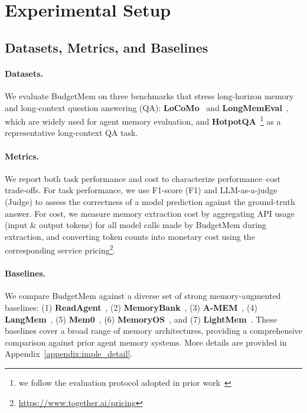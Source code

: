 \section{Experimental Setup}
\label{sec:exp}






\subsection{Datasets, Metrics, and Baselines}
\label{sec:datasets_metrics_baselines}

\paragraph{Datasets.}
We evaluate BudgetMem on three benchmarks that stress long-horizon memory and long-context question answering (QA): \textbf{LoCoMo}~\citep{maharana2024evaluating-locomo} and \textbf{LongMemEval}~\citep{wu2024longmemeval}, which are widely used for agent memory evaluation, and \textbf{HotpotQA}~\citep{yang2018hotpotqa}\footnote{we follow the evaluation protocol adopted in prior work~\citep{yu2025memagent}} as a representative long-context QA task. 


\paragraph{Metrics.}
We report both task performance and cost to characterize performance--cost trade-offs.
For task performance, we use F1-score (F1) and LLM-as-a-judge (Judge) to assess the correctness of a model prediction against the ground-truth answer.
For cost, we measure memory extraction cost by aggregating API usage (input \& output tokens) for all model calls made by BudgetMem during extraction, and converting token counts into monetary cost using the corresponding service pricing\footnote{\url{https://www.together.ai/pricing}}.



\paragraph{Baselines.}
We compare BudgetMem against a diverse set of strong memory-augmented baselines: 
(1) \textbf{ReadAgent}~\citep{lee2024human}, (2) \textbf{MemoryBank}~\citep{zhong2024memorybank}, (3) \textbf{A-MEM}~\citep{xu2025mem}, (4) \textbf{LangMem}~\citep{LangMem}, (5) \textbf{Mem0}~\citep{chhikara2025mem0}, (6) \textbf{MemoryOS}~\citep{kang2025memory}, and (7) \textbf{LightMem}~\citep{fang2025lightmem}. 
These baselines cover a broad range of memory architectures, providing a comprehensive comparison against prior agent memory systems. More details are provided in Appendix~\ref{appendix:imple_detail}.



